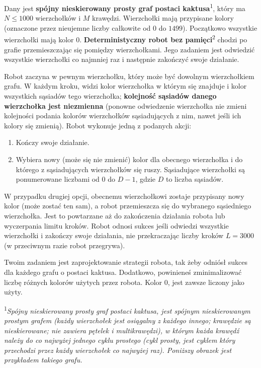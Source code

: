 \documentclass[12pt]{article}
\begin{document}
\renewcommand{\round}{Dzień 2}
\renewcommand{\problemName}{Nawigacja}
\renewcommand{\lang}{Polski}

\renewcommand{\tl}{$3$ sek.}
\renewcommand{\ml}{$512$ MB}
\problem{\problemName}

Dany jest \textbf{spójny nieskierowany prosty graf postaci kaktusa}\textsuperscript{1}, który ma $N \leq 1000$ wierzchołków i $M$ krawędzi. Wierzchołki mają przypisane kolory (oznaczone przez nieujemne liczby całkowite od $0$ do $1499$). Początkowo wszystkie wierzchołki mają kolor $0$. \textbf{Deterministyczny robot bez pamięci}\textsuperscript{2} chodzi po grafie przemieszczając się pomiędzy wierzchołkami. Jego zadaniem jest odwiedzić wszystkie wierzchołki co najmniej raz i następnie zakończyć swoje działanie.

Robot zaczyna w pewnym wierzchołku, który może być dowolnym wierzchołkiem grafu. W każdym kroku, widzi kolor wierzchołka w którym się znajduje i kolor wszystkich sąsiadów tego wierzchołka; \textbf{kolejność sąsiadów danego wierzchołka jest niezmienna} (ponowne odwiedzenie wierzchołka nie zmieni kolejności podania kolorów wierzchołków sąsiadujących z nim, nawet jeśli ich kolory się zmienią). Robot wykonuje jedną z podanych akcji:
\begin{enumerate}
    \item Kończy swoje działanie.
    \item Wybiera nowy (może się nie zmienić) kolor dla obecnego wierzchołka i do którego z sąsiadujących wierzchołków się ruszy. Sąsiadujące wierzchołki są ponumerowane liczbami od $0$ do $D-1$, gdzie $D$ to liczba sąsiadów.
\end{enumerate}

W przypadku drugiej opcji, obecnemu wierzchołkowi zostaje przypisany nowy kolor (może zostać ten sam), a robot przemieszcza się do wybranego sąsiedniego wierzchołka. Jest to powtarzane aż do zakończenia działania robota lub wyczerpania limitu kroków. Robot odnosi sukces jeśli odwiedzi wszystkie wierzchołki i zakończy swoje działania, nie przekraczając liczby kroków $L = 3000$ (w przeciwnym razie robot przegrywa).

Twoim zadaniem jest zaprojektowanie strategii robota, tak żeby odniósł sukces dla każdego grafu o postaci kaktusa. Dodatkowo, powinieneś zminimalizować liczbę różnych kolorów użytych przez robota. Kolor 0, jest zawsze liczony jako użyty.

\textsuperscript{1}\textit{Spójny nieskierowany prosty graf postaci kaktusa, jest spójnym nieskierowanym prostym grafem  (każdy wierzchołek jest osiągalny z każdego innego; krawędzie są nieskierowane; nie zawiera pętelek i multikrawędzi), w którym każda krawędź należy do co najwyżej jednego cyklu prostego (cykl prosty, jest cyklem który przechodzi przez każdy wierzchołek co najwyżej raz). Poniższy obrazek jest przykładem takiego grafu.}
\end{document}
